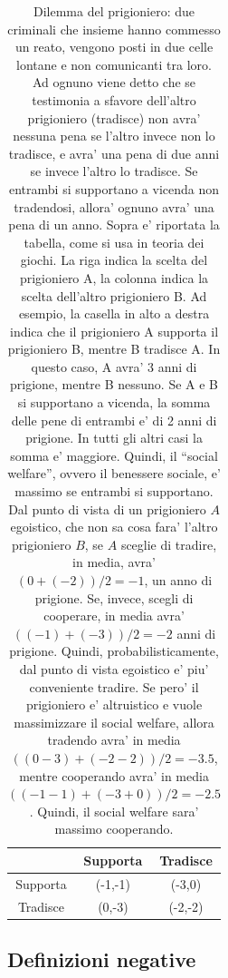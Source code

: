 \begin{center}
    \begin{table}
        \begin{tabular}{ |c|c|c| }
            \hline
            &  Supporta   &   Tradisce \\
            \hline
            Supporta   & (-1,-1) & (-3,0) \\
            \hline
            Tradisce & (0,-3) & (-2,-2) \\
            \hline
        \end{tabular}
        \caption{\label{tabPrisonerDilemma}Dilemma del prigioniero: due criminali che insieme hanno commesso un reato, vengono posti in due celle lontane e non comunicanti tra loro. Ad ognuno viene detto che se testimonia a sfavore dell'altro prigioniero (tradisce) non avra' nessuna pena se l'altro invece non lo tradisce, e avra' una pena di due anni se invece l'altro lo tradisce. Se entrambi si supportano a vicenda non tradendosi, allora' ognuno avra' una pena di un anno. Sopra e' riportata la tabella, come si usa in teoria dei giochi. La riga indica la scelta del prigioniero A, la colonna indica la scelta dell'altro prigioniero B. Ad esempio, la casella in alto a destra indica che il prigioniero A supporta il prigioniero B, mentre B tradisce A. In questo caso, A avra' 3 anni di prigione, mentre B nessuno. Se A e B si supportano a vicenda, la somma delle pene di entrambi e' di 2 anni di prigione. In tutti gli altri casi la somma e' maggiore. Quindi, il ``social welfare'', ovvero il benessere sociale, e' massimo se entrambi si supportano. Dal punto di vista di un prigioniero $A$ egoistico, che non sa cosa fara' l'altro prigioniero $B$, se $A$ sceglie di tradire, in media, avra' $(0+(-2))/2 = -1$, un anno di prigione. Se, invece, scegli di cooperare, in media avra' $((-1)+(-3))/2=-2$ anni di prigione. Quindi, probabilisticamente, dal punto di vista egoistico e' piu' conveniente tradire. Se pero' il prigioniero e' altruistico e vuole massimizzare il social welfare, allora tradendo avra' in media $((0-3)+(-2-2))/2=-3.5$, mentre cooperando avra' in media $((-1-1)+(-3+0))/2=-2.5$. Quindi, il social welfare sara' massimo cooperando.}

    \end{table}
\end{center}

\pagebreak

\subsection{Definizioni negative}

